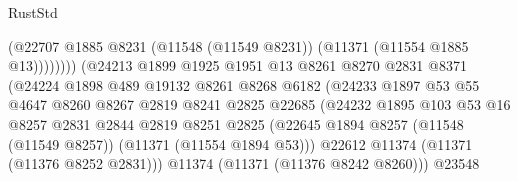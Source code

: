 \begin{lexlean}{RustStd}
\begin{coremodule}
                                            (@22707
                                              @1885
                                              @8231
                                              (@11548 (@11549 @8231))
                                              (@11371 (@11554 @1885 @13))))))))
                                  (@24213
                                    @1899
                                    @1925
                                    @1951
                                    @13
                                    @8261
                                    @8270
                                    @2831
                                    @8371
                                    (@24224
                                      @1898
                                      @489
                                      @19132
                                      @8261
                                      @8268
                                      @6182
                                      (@24233
                                        @1897
                                        @53
                                        @55
                                        @4647
                                        @8260
                                        @8267
                                        @2819
                                        @8241
                                        @2825
                                        @22685
                                        (@24232
                                          @1895
                                          @103
                                          @53
                                          @16
                                          @8257
                                          @2831
                                          @2844
                                          @2819
                                          @8251
                                          @2825
                                          (@22645
                                            @1894
                                            @8257
                                            (@11548 (@11549 @8257))
                                            (@11371 (@11554 @1894 @53)))
                                          @22612
                                          @11374
                                          (@11371 (@11376 @8252 @2831)))
                                        @11374
                                        (@11371 (@11376 @8242 @8260)))
                                      @23548

\end{coremodule}
\end{lexlean}
